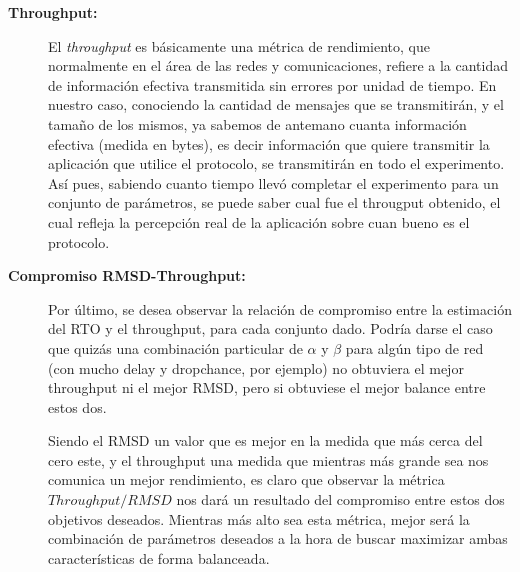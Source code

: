 \begin{description}
    \bigskip
    \item[\textbf{Throughput:}] El \emph{throughput}\cite{hroughput} es
        b\'asicamente una m\'etrica de rendimiento, que normalmente en el \'area
        de las redes y comunicaciones, refiere a la cantidad de informaci\'on
        efectiva transmitida sin errores por unidad de tiempo.
        En nuestro caso, conociendo la cantidad de mensajes que se
        transmitir\'an, y el tama\~no de los mismos, ya sabemos de antemano
        cuanta informaci\'on efectiva (medida en bytes), es decir informaci\'on
        que quiere transmitir la aplicaci\'on que utilice el protocolo, se
        transmitir\'an en todo el experimento. As\'i pues, sabiendo cuanto
        tiempo llev\'o completar el experimento para un conjunto de
        par\'ametros, se puede saber cual fue el througput obtenido, el cual
        refleja la percepci\'on real de la aplicaci\'on sobre cuan bueno es el
        protocolo.

    \bigskip
    \item[\textbf{Compromiso RMSD-Throughput:}] Por \'ultimo, se desea observar
        la relaci\'on de compromiso entre la estimaci\'on del RTO y el
        throughput, para cada conjunto dado. Podr\'ia darse el caso que quiz\'as
        una combinaci\'on particular de $\alpha$ y $\beta$ para alg\'un tipo de
        red (con mucho delay y dropchance, por ejemplo) no obtuviera el mejor
        throughput ni el mejor RMSD, pero si obtuviese el mejor balance entre
        estos dos.

        \par Siendo el RMSD un valor que es mejor en la medida que m\'as cerca
        del cero este, y el throughput una medida que mientras m\'as grande sea
        nos comunica un mejor rendimiento, es claro que observar la m\'etrica
        $Throughput / RMSD$ nos dar\'a un resultado del compromiso entre estos
        dos objetivos deseados. Mientras m\'as alto sea esta m\'etrica, mejor
        ser\'a la combinaci\'on de par\'ametros deseados a la hora de buscar
        maximizar ambas caracter\'isticas de forma balanceada.

\end{description}

